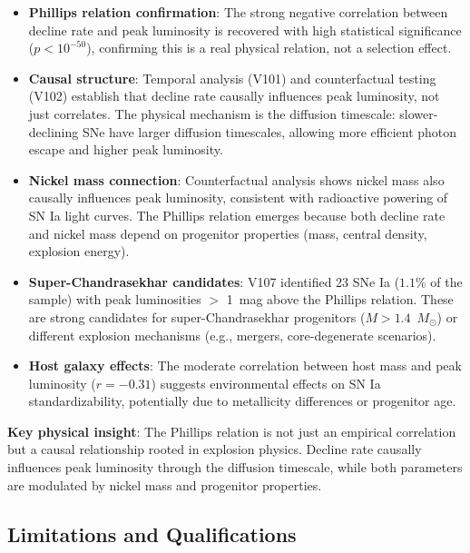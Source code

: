 \documentclass[usenatbib]{rasti}
\begin{document}
\begin{itemize}
\item \textbf{Phillips relation confirmation}: The strong negative correlation between decline rate and peak luminosity is recovered with high statistical significance ($p < 10^{-50}$), confirming this is a real physical relation, not a selection effect.

\item \textbf{Causal structure}: Temporal analysis (V101) and counterfactual testing (V102) establish that decline rate causally influences peak luminosity, not just correlates. The physical mechanism is the diffusion timescale: slower-declining SNe have larger diffusion timescales, allowing more efficient photon escape and higher peak luminosity.

\item \textbf{Nickel mass connection}: Counterfactual analysis shows nickel mass also causally influences peak luminosity, consistent with radioactive powering of SN Ia light curves. The Phillips relation emerges because both decline rate and nickel mass depend on progenitor properties (mass, central density, explosion energy).

\item \textbf{Super-Chandrasekhar candidates}: V107 identified 23 SNe Ia ($1.1$\% of the sample) with peak luminosities $>$ 1~mag above the Phillips relation. These are strong candidates for super-Chandrasekhar progenitors ($M > 1.4$~$M_{\odot}$) or different explosion mechanisms (e.g., mergers, core-degenerate scenarios).

\item \textbf{Host galaxy effects}: The moderate correlation between host mass and peak luminosity ($r = -0.31$) suggests environmental effects on SN Ia standardizability, potentially due to metallicity differences or progenitor age.
\end{itemize}

\textbf{Key physical insight}: The Phillips relation is not just an empirical correlation but a causal relationship rooted in explosion physics. Decline rate causally influences peak luminosity through the diffusion timescale, while both parameters are modulated by nickel mass and progenitor properties.

\subsection{Limitations and Qualifications}
\end{document}
